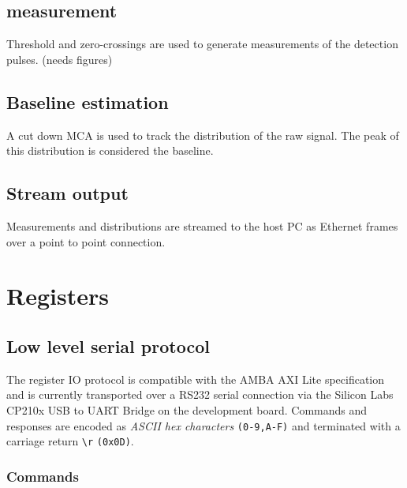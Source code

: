 \documentclass{article}
\newcommand{\code}[1]{\texttt{#1}}
\newcommand{\return}{\code{\textbackslash r}}
\begin{document}
\subsection{measurement}
Threshold and zero-crossings are used to generate measurements of the detection
pulses. (needs figures)
\subsection{Baseline estimation}
A cut down MCA is used to track the distribution of the raw signal. The peak of
this distribution is considered the baseline. 

\subsection{Stream output}
Measurements and distributions are streamed to the host PC as Ethernet frames
over a point to point connection. 

%   
% 
%   
% 
%   

\section{Registers}


\subsection{Low level serial protocol}

The register IO protocol is compatible with the AMBA AXI Lite specification and
is currently transported over a RS232 serial connection via the Silicon Labs
CP210x USB to UART Bridge on the development board.
Commands and responses are encoded as \emph{ASCII hex characters}
\code{(0-9,A-F)} and terminated with a carriage return \return{} \code{(0x0D)}.

\subsubsection{Commands}
\end{document}

